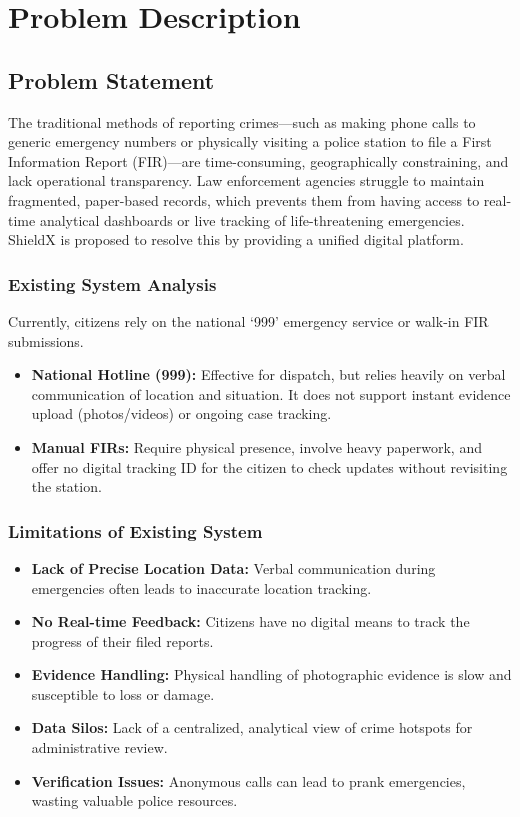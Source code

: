 \documentclass[12pt, a4paper, twoside]{report}
\begin{document}
\chapter{Problem Description}
\section{Problem Statement}
The traditional methods of reporting crimes---such as making phone calls to generic emergency numbers or physically visiting a police station to file a First Information Report (FIR)---are time-consuming, geographically constraining, and lack operational transparency. Law enforcement agencies struggle to maintain fragmented, paper-based records, which prevents them from having access to real-time analytical dashboards or live tracking of life-threatening emergencies. ShieldX is proposed to resolve this by providing a unified digital platform.

\subsection{Existing System Analysis}
Currently, citizens rely on the national `999' emergency service or walk-in FIR submissions. 
\begin{itemize}
    \item \textbf{National Hotline (999):} Effective for dispatch, but relies heavily on verbal communication of location and situation. It does not support instant evidence upload (photos/videos) or ongoing case tracking.
    \item \textbf{Manual FIRs:} Require physical presence, involve heavy paperwork, and offer no digital tracking ID for the citizen to check updates without revisiting the station.
\end{itemize}

\subsection{Limitations of Existing System}
\begin{itemize}
    \item \textbf{Lack of Precise Location Data:} Verbal communication during emergencies often leads to inaccurate location tracking.
    \item \textbf{No Real-time Feedback:} Citizens have no digital means to track the progress of their filed reports.
    \item \textbf{Evidence Handling:} Physical handling of photographic evidence is slow and susceptible to loss or damage.
    \item \textbf{Data Silos:} Lack of a centralized, analytical view of crime hotspots for administrative review.
    \item \textbf{Verification Issues:} Anonymous calls can lead to prank emergencies, wasting valuable police resources.
\end{itemize}
\end{document}
